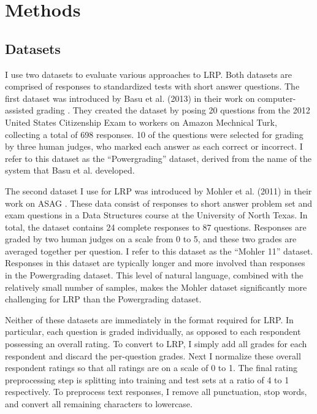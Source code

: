 \section{Methods}
\subsection{Datasets}
I use two datasets to evaluate various approaches to LRP. Both datasets are comprised of responses to standardized tests with short answer questions. The first dataset was introduced by Basu et al. (2013) in their work on computer-assisted grading  \citep{basu2013powergrading}. They created the dataset by posing 20 questions from the 2012 United States Citizenship Exam to workers on Amazon Mechnical Turk, collecting a total of 698 responses. 10 of the questions were selected for grading by three human judges, who marked each answer as each correct or incorrect. I refer to this dataset as the ``Powergrading'' dataset, derived from the name of the system that Basu et al. developed.

The second dataset I use for LRP was introduced by Mohler et al. (2011) in their work on ASAG  \citep{mohler2011learning}. These data consist of responses to short answer problem set and exam questions in a Data Structures course at the University of North Texas. In total, the dataset contains 24 complete responses to 87 questions. Responses are graded by two human judges on a scale from 0 to 5, and these two grades are averaged together per question. I refer to this dataset as the ``Mohler 11'' dataset. Responses in this dataset are typically longer and more involved than responses in the Powergrading dataset. This level of natural language, combined with the relatively small number of samples, makes the Mohler dataset significantly more challenging for LRP than the Powergrading dataset.

Neither of these datasets are immediately in the format required for LRP. In particular, each question is graded individually, as opposed to each respondent possessing an overall rating. To convert to LRP, I simply add all grades for each respondent and discard the per-question grades. Next I normalize these overall respondent ratings so that all ratings are on a scale of 0 to 1. The final rating preprocessing step is splitting into training and test sets at a ratio of 4 to 1 respectively. To preprocess text responses, I remove all punctuation, stop words, and convert all remaining characters to lowercase.

